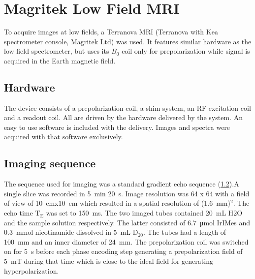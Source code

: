     \section{Magritek Low Field MRI}
    To acquire images at low fields, a Terranova MRI (Terranova with Kea spectrometer console, Magritek Ltd) was used. It features similar hardware as the low field spectrometer, but uses its $B_0$ coil only for prepolarization while signal is acquired in the Earth magnetic field.
        \subsection{Hardware}
            The device consists of a prepolarization coil, a shim system, an RF-excitation coil and a readout coil. All are driven by the hardware delivered by the system. An easy to use software is included with the delivery. Images and spectra were acquired with that software exclusively.
        \subsection{Imaging sequence}
        The sequence used for imaging was a standard gradient echo sequence (\ref{}).A single slice was recorded in \SI{5}{\minute} \SI{20}{\second}. Image resolution was 64 x 64 with a field of view of \SI{10}{\cm}x\SI{10}{\cm} which resulted in a spatial resolution of (\SI{1.6}{\mm})$^2$. The echo time $\mathrm{T_E}$ was set to \SI{150}{\milli\second}. The two imaged tubes contained \SI{20}{\milli\liter} H2O and the sample solution respectively. The latter consisted of \SI{6.7}{\micro\mole} IrIMes and \SI{0.3}{\milli\mole} nicotinamide dissolved in \SI{5}{\milli\liter} $\mathrm{D_20}$. The tubes had a length of \SI{100}{\milli\meter} and an inner diameter of \SI{24}{\milli\meter}. The prepolarization coil was switched on for \SI{5}{\second} before each phase encoding step generating a prepolarization field of \SI{5}{\milli\tesla} during that time which is close to the ideal field for generating hyperpolarization.
